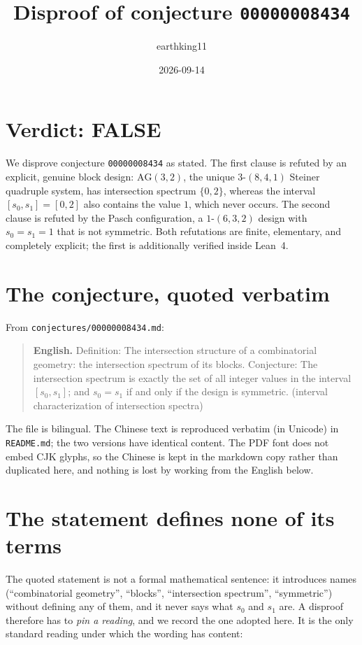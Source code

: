 \documentclass[11pt]{article}
\title{Disproof of conjecture \texttt{00000008434}}
\author{earthking11}
\date{2026-09-14}
\theoremstyle{definition}
\theoremstyle{remark}
\newcommand{\AG}{\mathrm{AG}}
\begin{document}
\maketitle

\section*{Verdict: FALSE}

We disprove conjecture \texttt{00000008434} as stated. The first clause is
refuted by an explicit, genuine block design: $\AG(3,2)$, the unique
$3$-$(8,4,1)$ Steiner quadruple system, has intersection spectrum
$\{0,2\}$, whereas the interval $[s_0,s_1] = [0,2]$ also contains the value
$1$, which never occurs. The second clause is refuted by the Pasch
configuration, a $1$-$(6,3,2)$ design with $s_0 = s_1 = 1$ that is not
symmetric. Both refutations are finite, elementary, and completely explicit;
the first is additionally verified inside Lean~4.

\section{The conjecture, quoted verbatim}

From \texttt{conjectures/00000008434.md}:

\begin{quote}
\textbf{English.} Definition: The intersection structure of a combinatorial
geometry: the intersection spectrum of its blocks. Conjecture: The
intersection spectrum is exactly the set of all integer values in the
interval $[s_0,s_1]$; and $s_0 = s_1$ if and only if the design is symmetric.
(interval characterization of intersection spectra)
\end{quote}

The file is bilingual. The Chinese text is reproduced verbatim (in Unicode) in
\texttt{README.md}; the two versions have identical content. The PDF font does
not embed CJK glyphs, so the Chinese is kept in the markdown copy rather than
duplicated here, and nothing is lost by working from the English below.

\section{The statement defines none of its terms}

The quoted statement is not a formal mathematical sentence: it introduces
names (``combinatorial geometry'', ``blocks'', ``intersection spectrum'',
``symmetric'') without defining any of them, and it never says what $s_0$ and
$s_1$ are. A disproof therefore has to \emph{pin a reading}, and we record the
one adopted here. It is the only standard reading under which the wording has
content:
\end{document}
